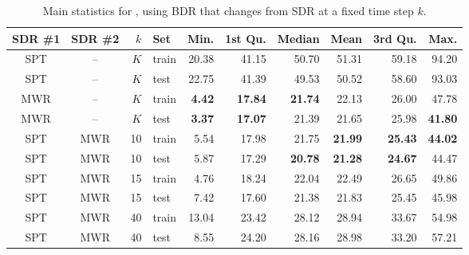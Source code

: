 \begin{table}[p]
\caption{Main statistics for  \namerho, using BDR that changes 
from SDR at a fixed time step $k$.}\label{tbl:BDR:stats} 
\centering
\begin{tabular}{ccrlrrrrrr}
  \toprule
  SDR \#1 & SDR \#2 & $k$ & Set & Min. & 1st Qu. & Median & Mean & 
    3rd Qu. & Max. \\ \midrule
  SPT & -- & $K$ & train & 20.38 & 41.15 & 50.70 & 51.31 & 59.18 & 94.20 \\ 
  SPT & -- & $K$ & test & 22.75 & 41.39 & 49.53 & 50.52 & 58.60 & 93.03 \\ 
  MWR & -- & $K$ & train & \textbf{4.42} & \textbf{17.84} & \textbf{21.74} & 
  22.13 & 26.00 & 47.78 \\ 
  MWR & -- & $K$ & test & \textbf{3.37} & \textbf{17.07} & 21.39 & 21.65 & 
  25.98 & \textbf{41.80} \\ 
  SPT & MWR & 10 & train & 5.54 & 17.98 & 21.75 & \textbf{21.99} & 
  \textbf{25.43} & \textbf{44.02} \\ 
  SPT & MWR & 10 & test & 5.87 & 17.29 & \textbf{20.78} & \textbf{21.28} & 
  \textbf{24.67} & 44.47 \\ 
  SPT & MWR & 15 & train & 4.76 & 18.24 & 22.04 & 22.49 & 26.65 & 49.86 \\ 
  SPT & MWR & 15 & test & 7.42 & 17.60 & 21.38 & 21.83 & 25.45 & 45.98 \\ 
  SPT & MWR & 40 & train & 13.04 & 23.42 & 28.12 & 28.94 & 33.67 & 54.98 \\ 
  SPT & MWR & 40 & test & 8.55 & 24.20 & 28.16 & 28.98 & 33.20 & 57.21 \\ 
  \bottomrule
\end{tabular}
\end{table}